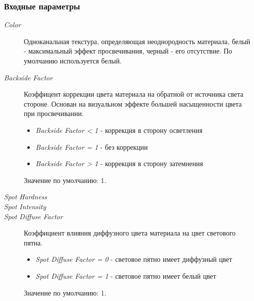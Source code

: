 \documentclass[a4paper,12pt,oneside]{sphinxmanual}
\begin{document}
\subsubsection{Входные параметры}
\label{node_materials:id6}\begin{description}
\item[{\emph{Color}}] \leavevmode
Одноканальная текстура, определяющая неоднородность материала, белый - максимальный эффект просвечивания, черный - его отсутствие. По умолчанию используется белый.

\item[{\emph{Backside Factor}}] \leavevmode
Коэффицент коррекции цвета материала на обратной от источника света стороне. Основан на визуальном эффекте большей насыщенности цвета при просвечивании.
\begin{itemize}
\item {} 
\emph{Backside Factor \textless{} 1} - коррекция в сторону осветления

\item {} 
\emph{Backside Factor = 1} - без коррекции

\item {} 
\emph{Backside Factor \textgreater{} 1} - коррекция в сторону затемнения

\end{itemize}

Значение по умолчанию: 1.

\item[{\emph{Spot Hardness}}] \leavevmode
{}

\item[{\emph{Spot Intensity}}] \leavevmode
{}

\item[{\emph{Spot Diffuse Factor}}] \leavevmode
Коэффициент влияния диффузного цвета материала на цвет светового пятна.
\begin{itemize}
\item {} 
\emph{Spot Diffuse Factor = 0} - световое пятно имеет диффузный цвет

\item {} 
\emph{Spot Diffuse Factor = 1} - световое пятно имеет белый цвет

\end{itemize}

Значение по умолчанию: 1.

\end{description}
\end{document}
